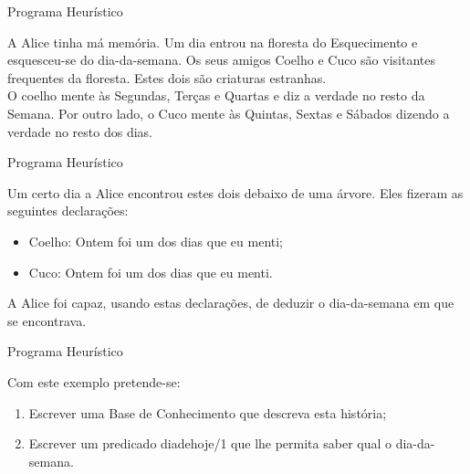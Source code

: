 \documentclass[portuges]{beamer}
\begin{document}

\begin{frame}{Programa Heurístico}
	\begin{example}
		A Alice tinha má memória.
		Um dia entrou na floresta do Esquecimento e esquesceu-se do dia-da-semana.
		Os seus amigos \alert{Coelho} e \alert{Cuco} são visitantes frequentes da floresta. Estes dois
		são criaturas estranhas.\\
		O coelho \alert{mente} às \alert{Segundas}, \alert{Terças} e \alert{Quartas} e diz a \alert{verdade} no \alert{resto da Semana}.
		Por outro lado, o Cuco \alert{mente} às \alert{Quintas}, \alert{Sextas} e \alert{Sábados} \alert{dizendo a verdade no resto dos dias}.
	\end{example}
\end{frame}

\begin{frame}{Programa Heurístico}
	\begin{example}
		Um certo dia a Alice encontrou estes dois debaixo de uma árvore. Eles fizeram as seguintes declarações:
		\begin{itemize}
			\item Coelho: \alert{Ontem} foi um dos dias que eu \alert{menti};
			\item Cuco: \alert{Ontem} foi um dos dias que eu \alert{menti}.
		\end{itemize}
		
		A Alice foi capaz, usando estas declarações, de deduzir o dia-da-semana em que se encontrava.
	\end{example}
\end{frame}

\begin{frame}{Programa Heurístico}
	\begin{example}
		Com este exemplo pretende-se: 
		\begin{enumerate}
			\item Escrever uma Base de Conhecimento que descreva esta história;
			\item Escrever um predicado diadehoje/1 que lhe permita saber qual o dia-da-semana.
		\end{enumerate}
	\end{example}
\end{frame}
\end{document}
